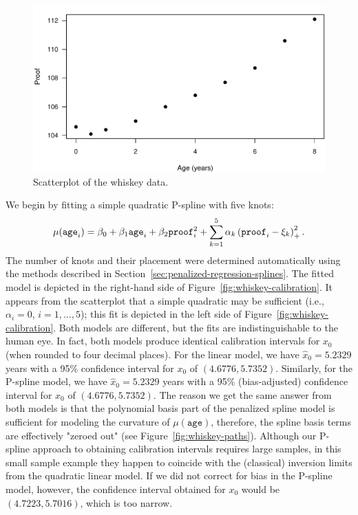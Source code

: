 \documentclass[cmfont,usenames,dvipsnames,leqno]{afit-etd}\usepackage[]{graphicx}\usepackage[]{color}
\makeatletter
\def\maxwidth{ %
  \ifdim\Gin@nat@width>\linewidth
    \linewidth
  \else
    \Gin@nat@width
  \fi
}
\newenvironment{knitrout}{}{} %
\renewenvironment{knitrout}{\begin{singlespace}}{\end{singlespace}}
\newcommand{\wh}[1]{\ensuremath{\widehat{#1}}}
\makeatother
\begin{document}
\begin{knitrout}
\color{fgcolor}\begin{figure}[H]

\includegraphics[width=\maxwidth]{figure/whiskey-scatter} \caption[Scatterplot of the whiskey data]{Scatterplot of the whiskey data.\label{fig:whiskey-scatter}}
\end{figure}


\end{knitrout}


We begin by fitting a simple quadratic \ac{P-spline} with five knots:
\begin{equation*}
  \mu(\text{\texttt{age}}_i) = \beta_0 + \beta_1\text{\texttt{age}}_i + \beta_2\text{\texttt{proof}}_i^2 + \sum_{k = 1}^5\alpha_k\left( \text{\texttt{proof}}_i - \xi_k \right)_+^2.
\end{equation*}
The number of knots and their placement were determined automatically using the methods described in Section~\ref{sec:penalized-regression-splines}. The fitted model is depicted in the right-hand side of Figure~\ref{fig:whiskey-calibration}. It appears from the scatterplot that a simple quadratic may be sufficient (i.e., $\alpha_i = 0$, $i = 1, \dotsc, 5$); this fit is depicted in the left side of Figure~\ref{fig:whiskey-calibration}. Both models are different, but the fits are indistinguishable to the human eye. In fact, both models produce identical calibration intervals for $x_0$ (when rounded to four decimal places). For the linear model, we have $\wh{x}_0 = 5.2329$ years with a 95\% confidence interval for $x_0$ of $(4.6776, 5.7352)$. Similarly, for the \ac{P-spline} model, we have $\wh{x}_0 = 5.2329$ years with a 95\% (bias-adjusted) confidence interval for $x_0$ of $(4.6776, 5.7352)$. The reason we get the same answer from both models is that the polynomial basis part of the penalized spline model is sufficient for modeling the curvature of $\mu(\texttt{age})$, therefore, the spline basis terms are effectively "zeroed out" (see Figure~\ref{fig:whiskey-paths}). Although our \ac{P-spline} approach to obtaining calibration intervals requires large samples, in this small sample example they happen to coincide with the (classical) inversion limits from the quadratic linear model. If we did not correct for bias in the \ac{P-spline} model, however, the confidence interval obtained for $x_0$ would be $(4.7223, 5.7016)$, which is too narrow.
\end{document}
